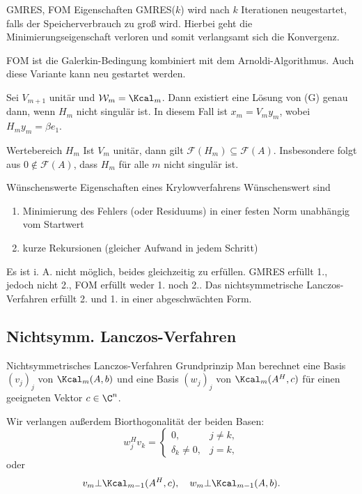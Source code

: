 \begin{karte}{GMRES, FOM Eigenschaften}
    GMRES(\(k\)) wird nach \(k\) Iterationen neugestartet, falls der Speicherverbrauch 
    zu groß wird.
    Hierbei geht die Minimierungseigenschaft verloren und somit verlangsamt sich die Konvergenz.

    FOM ist die Galerkin-Bedingung kombiniert mit dem Arnoldi-Algorithmus. 
    Auch diese Variante kann neu gestartet werden.

    Sei \( V_{m+1} \) unitär und \( \mathcal{W}_m = \Kcal_m \). Dann 
    existiert eine Lösung von (G) genau dann, wenn \(H_m\) nicht singulär ist. 
    In diesem Fall ist \(x_m = V_m y_m\), wobei \(H_m y_m = \beta e_1\).
\end{karte}

\begin{karte}{Wertebereich \( H_m \)}
    Ist \(V_m\) unitär, dann gilt 
    \( \mathcal{F}(H_m) \subseteq \mathcal{F}(A) \). Insbesondere folgt aus
    \( 0 \notin \mathcal{F}(A) \), dass \( H_m \) für alle \(m\) nicht singulär ist.
\end{karte}

\begin{karte}{Wünschenswerte Eigenschaften eines Krylowverfahrens}
    Wünschenswert sind
    \begin{enumerate}
        \item Minimierung des Fehlers (oder Residuums) in einer festen Norm unabhängig vom Startwert
        \item kurze Rekursionen (gleicher Aufwand in jedem Schritt)
    \end{enumerate}

    Es ist i. A. nicht möglich, beides gleichzeitig zu erfüllen. 
    GMRES erfüllt 1., jedoch nicht 2., FOM erfüllt weder 1. noch 2..
    Das nichtsymmetrische Lanczos-Verfahren erfüllt 2. und 1. in einer abgeschwächten Form.
\end{karte}

\subsection{Nichtsymm. Lanczos-Verfahren}

\begin{karte}{Nichtsymmetrisches Lanczos-Verfahren Grundprinzip}
    Man berechnet eine Basis \( (v_j)_j \) von \( \Kcal_m(A,b) \)
    und eine Basis \( (w_j)_j \) von \( \Kcal_m(A^H, c) \) für einen geeigneten 
    Vektor \(c\in \C^n\). 

    Wir verlangen außerdem Biorthogonalität der beiden Basen:
    \[ w_j^H v_k = \begin{cases}
        0, & j\neq k, \\ \delta_k \neq 0, & j = k,
    \end{cases} \]
    oder 
    \[ v_m \bot \Kcal_{m-1}(A^H, c), \quad w_m \bot \Kcal_{m-1}(A, b). \]
\end{karte}

